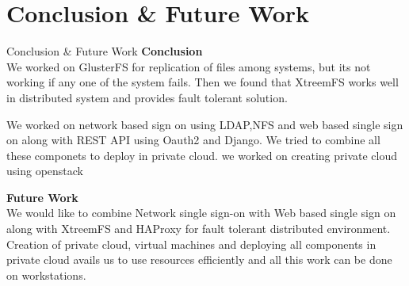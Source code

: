 \documentclass[10pt,xcolor=dvipsnames]{beamer}
\begin{document}
\section{Conclusion \& Future Work} 
\begin{frame}{Conclusion \& Future Work}
\textbf{Conclusion} \\

We worked on GlusterFS for replication of files among systems, but its not working if any one of the system fails. Then we found that XtreemFS works well in distributed system and provides fault tolerant solution. \newline

We worked on network based sign on using LDAP,NFS and web based single sign on along with REST API using Oauth2 and Django. We tried to combine all these componets to deploy in private cloud. we worked on creating private cloud using openstack \newline

\textbf{Future Work } \\
We would like to combine Network single sign-on with Web based single sign on along with XtreemFS and HAProxy for fault tolerant distributed environment. Creation of private cloud, virtual machines and deploying all components in private cloud avails us to use resources efficiently and all this work can be done on workstations.
\end{frame}
\end{document}
